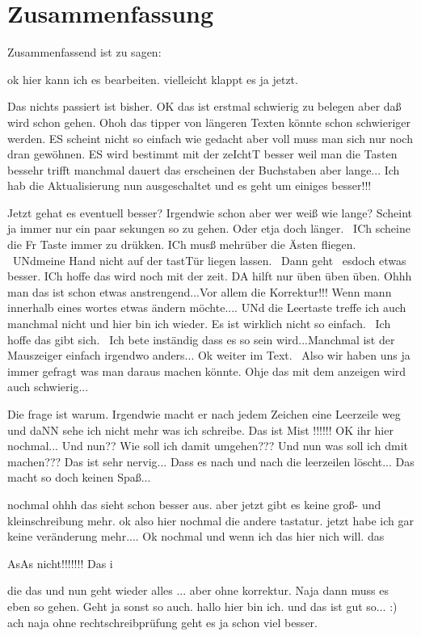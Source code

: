 \chapter{Zusammenfassung}

Zusammenfassend ist zu sagen:

ok hier kann ich es bearbeiten. vielleicht klappt es ja jetzt.

Das nichts passiert ist bisher. OK das ist erstmal schwierig zu belegen aber daß wird schon gehen. Ohoh das tipper von längeren Texten könnte schon schwieriger werden. ES scheint nicht so einfach wie gedacht aber voll muss man sich nur noch dran gewöhnen. ES wird bestimmt mit der zeIchtT besser weil man die Tasten bessehr trifft manchmal dauert das erscheinen der Buchstaben aber lange...  Ich hab die Aktualisierung nun ausgeschaltet und es geht um einiges besser!!!  

Jetzt gehat es eventuell besser? Irgendwie schon aber wer weiß wie lange? Scheint ja immer nur ein paar sekungen so zu gehen. Oder etja doch länger.  ICh scheine die Fr Taste immer zu drükken. ICh musß mehrüber die Ästen fliegen.  UNdmeine Hand nicht auf der tastTür liegen lassen.  Dann geht  esdoch etwas besser. ICh hoffe das wird noch mit der zeit. DA hilft nur üben üben üben. Ohhh man das ist schon etwas anstrengend...Vor allem die Korrektur!!! Wenn mann innerhalb eines wortes etwas ändern möchte.... UNd die Leertaste treffe ich auch manchmal nicht und hier bin ich wieder. Es ist wirklich nicht so einfach.  Ich hoffe das gibt sich.  Ich bete inständig dass es so sein wird...Manchmal ist der Mauszeiger einfach irgendwo anders... Ok weiter im Text.  Also wir haben uns ja immer gefragt was man daraus machen könnte. 
Ohje das mit dem anzeigen wird auch schwierig... 

Die frage ist warum. Irgendwie macht er nach jedem Zeichen eine Leerzeile weg und daNN sehe ich nicht mehr was ich schreibe. Das ist Mist !!!!!! OK ihr hier nochmal... Und nun?? Wie soll ich damit umgehen??? Und nun was soll ich dmit machen??? Das ist sehr nervig... Dass es nach und nach die leerzeilen löscht... Das macht so doch keinen Spaß... 


nochmal ohhh das sieht schon besser aus. aber jetzt gibt es keine groß- und kleinschreibung mehr. ok also hier nochmal die andere tastatur. jetzt habe ich gar keine veränderung mehr....
Ok nochmal und wenn ich das hier nich will.
 das 
 
 AsAs nicht!!!!!!! Das  i
 
  die das  und nun geht wieder alles ... aber ohne korrektur. Naja dann muss es eben so gehen. Geht ja sonst so auch. hallo hier bin ich. und das ist gut so... :) ach naja ohne rechtschreibprüfung geht es ja schon viel besser. 
 
